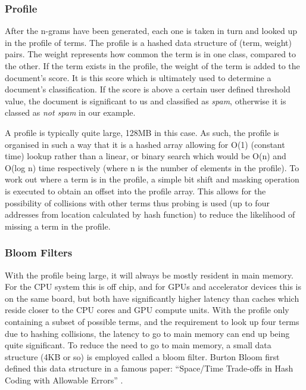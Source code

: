 \subsubsection{Profile}

After the n-grams have been generated, each one is taken in turn and looked up
in the profile of terms. The profile is a hashed data structure of (term,
weight) pairs. The weight represents how common the term is in one class,
compared to the other. If the term exists in the profile, the weight of the term
is added to the document's score. It is this score which is ultimately used to
determine a document's classification. If the score is above a certain user
defined threshold value, the document is significant to us and classified as
\emph{spam}, otherwise it is classed as \emph{not spam} in our example.

A profile is typically quite large, 128MB in this case. As such, the profile is
organised in such a way that it is a hashed array allowing for O(1) (constant
time) lookup rather than a linear, or binary search which would be O(n) and
O(log n) time respectively (where n is the number of elements in the profile).
To work out where a term is in the profile, a simple bit shift and masking
operation is executed to obtain an offset into the profile array. This allows
for the possibility of collisions with other terms thus probing is used (up to
four addresses from location calculated by hash function) to reduce the
likelihood of missing a term in the profile.

\subsubsection{Bloom Filters}

With the profile being large, it will always be mostly resident in main memory.
For the CPU system this is off chip, and for GPUs and accelerator devices this
is on the same board, but both have significantly higher latency than caches
which reside closer to the CPU cores and GPU compute units. With the profile
only containing a subset of possible terms, and the requirement to look up four
terms due to hashing collisions, the latency to go to main memory can end up
being quite significant. To reduce the need to go to main memory, a small data
structure (4KB or so) is employed called a bloom filter. Burton Bloom first
defined this data structure in a famous paper: ``Space/Time Trade-offs in Hash
Coding with Allowable Errors'' \cite{bloom1970space}.

